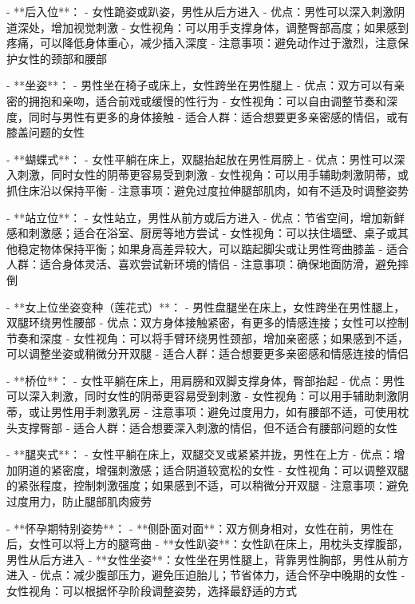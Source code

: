\begin{enumerate}
  - **后入位**：
    - 女性跪姿或趴姿，男性从后方进入
    - 优点：男性可以深入刺激阴道深处，增加视觉刺激
    - 女性视角：可以用手支撑身体，调整臀部高度；如果感到疼痛，可以降低身体重心，减少插入深度
    - 注意事项：避免动作过于激烈，注意保护女性的颈部和腰部

  - **坐姿**：
    - 男性坐在椅子或床上，女性跨坐在男性腿上
    - 优点：双方可以有亲密的拥抱和亲吻，适合前戏或缓慢的性行为
    - 女性视角：可以自由调整节奏和深度，同时与男性有更多的身体接触
    - 适合人群：适合想要更多亲密感的情侣，或有膝盖问题的女性

  - **蝴蝶式**：
    - 女性平躺在床上，双腿抬起放在男性肩膀上
    - 优点：男性可以深入刺激，同时女性的阴蒂更容易受到刺激
    - 女性视角：可以用手辅助刺激阴蒂，或抓住床沿以保持平衡
    - 注意事项：避免过度拉伸腿部肌肉，如有不适及时调整姿势

  - **站立位**：
    - 女性站立，男性从前方或后方进入
    - 优点：节省空间，增加新鲜感和刺激感；适合在浴室、厨房等地方尝试
    - 女性视角：可以扶住墙壁、桌子或其他稳定物体保持平衡；如果身高差异较大，可以踮起脚尖或让男性弯曲膝盖
    - 适合人群：适合身体灵活、喜欢尝试新环境的情侣
    - 注意事项：确保地面防滑，避免摔倒

  - **女上位坐姿变种（莲花式）**：
    - 男性盘腿坐在床上，女性跨坐在男性腿上，双腿环绕男性腰部
    - 优点：双方身体接触紧密，有更多的情感连接；女性可以控制节奏和深度
    - 女性视角：可以将手臂环绕男性颈部，增加亲密感；如果感到不适，可以调整坐姿或稍微分开双腿
    - 适合人群：适合想要更多亲密感和情感连接的情侣

  - **桥位**：
    - 女性平躺在床上，用肩膀和双脚支撑身体，臀部抬起
    - 优点：男性可以深入刺激，同时女性的阴蒂更容易受到刺激
    - 女性视角：可以用手辅助刺激阴蒂，或让男性用手刺激乳房
    - 注意事项：避免过度用力，如有腰部不适，可使用枕头支撑臀部
    - 适合人群：适合想要深入刺激的情侣，但不适合有腰部问题的女性

  - **腿夹式**：
    - 女性平躺在床上，双腿交叉或紧紧并拢，男性在上方
    - 优点：增加阴道的紧密度，增强刺激感；适合阴道较宽松的女性
    - 女性视角：可以调整双腿的紧张程度，控制刺激强度；如果感到不适，可以稍微分开双腿
    - 注意事项：避免过度用力，防止腿部肌肉疲劳

  - **怀孕期特别姿势**：
    - **侧卧面对面**：双方侧身相对，女性在前，男性在后，女性可以将上方的腿弯曲
    - **女性趴姿**：女性趴在床上，用枕头支撑腹部，男性从后方进入
    - **女性坐姿**：女性坐在男性腿上，背靠男性胸部，男性从前方进入
    - 优点：减少腹部压力，避免压迫胎儿；节省体力，适合怀孕中晚期的女性
    - 女性视角：可以根据怀孕阶段调整姿势，选择最舒适的方式


\end{enumerate}

